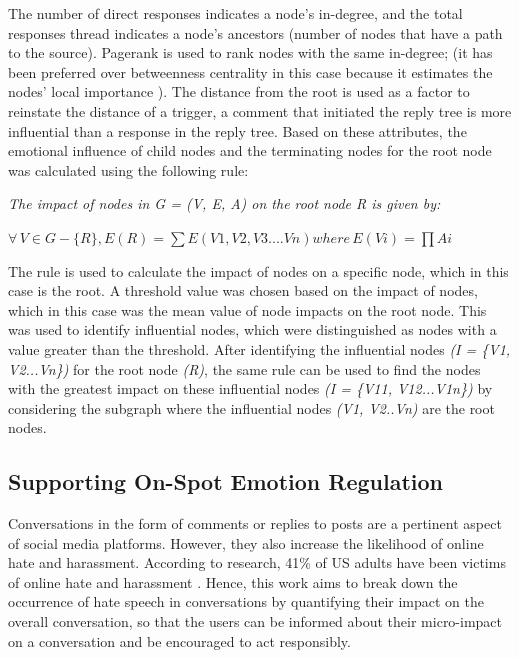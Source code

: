 \documentclass[acmtog]{acmart}
\begin{document}
The number of direct responses indicates a node's in-degree, and the total responses thread indicates a node's ancestors (number of nodes that have a path to the source). Pagerank is used to rank nodes with the same in-degree; (it has been preferred over betweenness centrality in this case because it estimates the nodes' local importance \cite{antonakaki2021survey}). The distance from the root is used as a factor to reinstate the distance of a trigger, a comment that initiated the reply tree is more influential than a response in the reply tree. Based on these attributes, the emotional influence of child nodes and the terminating nodes for the root node was calculated using the following rule: 


\textit{The impact of nodes in G = (V, E, A) on the root node R is given by:}

% 
$\forall \,V \in G-\{R\},
E(R) = \sum{E(V1, V2, V3....Vn)}
where \,E(Vi) =\prod{Ai}$

The rule is used to calculate the impact of nodes on a specific node, which in this case is the root. A threshold value was chosen based on the impact of nodes, which in this case was the mean value of node impacts on the root node. This was used to identify influential nodes, which were distinguished as nodes with a value greater than the threshold. After identifying the influential nodes \textit{(I = \{V1, V2...Vn\})} for the root node \textit{(R)}, the same rule can be used to find the nodes with the greatest impact on these influential nodes  \textit{(I = \{V11, V12...V1n\})} by considering the subgraph where the influential nodes \textit{(V1, V2..Vn)} are the root nodes.



\subsection{Supporting On-Spot Emotion Regulation}
Conversations in the form of comments or replies to posts are a pertinent aspect of social media platforms. However, they also increase the likelihood of online hate and harassment. According to research, 41\% of US adults have been victims of online hate and harassment \cite{thomas2022s}. Hence, this work aims to break down the occurrence of hate speech in conversations by quantifying their impact on the overall conversation, so that the users can be informed about their micro-impact on a conversation and be encouraged to act responsibly.
\end{document}

